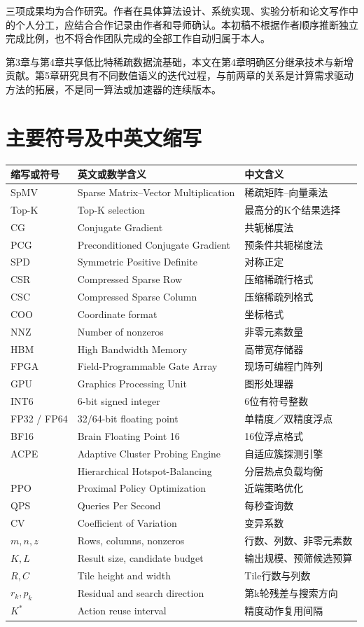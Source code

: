 三项成果均为合作研究。作者在具体算法设计、系统实现、实验分析和论文写作中的个人分工，应结合合作记录由作者和导师确认。本初稿不根据作者顺序推断独立完成比例，也不将合作团队完成的全部工作自动归属于本人。

第3章与第4章共享低比特稀疏数据流基础，本文在第4章明确区分继承技术与新增贡献。第5章研究具有不同数值语义的迭代过程，与前两章的关系是计算需求驱动方法的拓展，不是同一算法或加速器的连续版本。

\chapter{主要符号及中英文缩写}
\begin{longtable}{p{2.7cm}p{5.3cm}p{5.3cm}}
\toprule 缩写或符号&英文或数学含义&中文含义\\\midrule\endhead
SpMV&Sparse Matrix--Vector Multiplication&稀疏矩阵--向量乘法\\
Top-K&Top-K selection&最高分的K个结果选择\\
CG&Conjugate Gradient&共轭梯度法\\
PCG&Preconditioned Conjugate Gradient&预条件共轭梯度法\\
SPD&Symmetric Positive Definite&对称正定\\
CSR&Compressed Sparse Row&压缩稀疏行格式\\
CSC&Compressed Sparse Column&压缩稀疏列格式\\
COO&Coordinate format&坐标格式\\
NNZ&Number of nonzeros&非零元素数量\\
HBM&High Bandwidth Memory&高带宽存储器\\
FPGA&Field-Programmable Gate Array&现场可编程门阵列\\
GPU&Graphics Processing Unit&图形处理器\\
INT6&6-bit signed integer&6位有符号整数\\
FP32 / FP64&32/64-bit floating point&单精度／双精度浮点\\
BF16&Brain Floating Point 16&16位浮点格式\\
ACPE&Adaptive Cluster Probing Engine&自适应簇探测引擎\\
\hbalance{}&Hierarchical Hotspot-Balancing&分层热点负载均衡\\
PPO&Proximal Policy Optimization&近端策略优化\\
QPS&Queries Per Second&每秒查询数\\
CV&Coefficient of Variation&变异系数\\
$m,n,z$&Rows, columns, nonzeros&行数、列数、非零元素数\\
$K,L$&Result size, candidate budget&输出规模、预筛候选预算\\
$R,C$&Tile height and width&Tile行数与列数\\
$r_k,p_k$&Residual and search direction&第k轮残差与搜索方向\\
$K^*$&Action reuse interval&精度动作复用间隔\\\bottomrule
\end{longtable}
